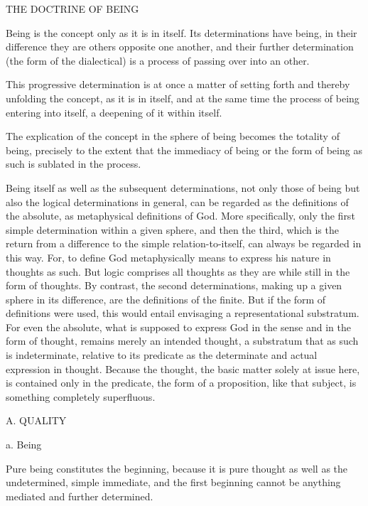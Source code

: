THE DOCTRINE OF BEING

Being is the concept only as it is in itself.
Its determinations have being,
in their difference they are others opposite one another, and
their further determination (the form of the dialectical) is
a process of passing over into an other.

This progressive determination is at once
a matter of setting forth
and thereby unfolding the concept,
as it is in itself, and at the same time
the process of being entering into itself,
a deepening of it within itself.

The explication of the concept
in the sphere of being
becomes the totality of being,
precisely to the extent that
the immediacy of being or
the form of being as such
is sublated in the process.

Being itself as well as the subsequent determinations,
not only those of being but also the
logical determinations in general,
can be regarded as the definitions of the absolute,
as metaphysical definitions of God.
More specifically, only the first simple
determination within a given sphere,
and then the third, which is the return
from a difference to the simple relation-to-itself,
can always be regarded in this way.
For, to define God metaphysically means
to express his nature in thoughts as such.
But logic comprises all thoughts as they are
while still in the form of thoughts.
By contrast, the second determinations,
making up a given sphere in its difference,
are the definitions of the finite.
But if the form of definitions were used,
this would entail envisaging a representational substratum.
For even the absolute, what is supposed to express God
in the sense and in the form of thought,
remains merely an intended thought,
a substratum that as such is indeterminate,
relative to its predicate as the determinate
and actual expression in thought.
Because the thought, the basic matter solely at issue here,
is contained only in the predicate,
the form of a proposition, like that subject,
is something completely superfluous.

A. QUALITY

a. Being

Pure being constitutes the beginning,
because it is pure thought as well as
the undetermined, simple immediate, and
the first beginning cannot be anything
mediated and further determined.

